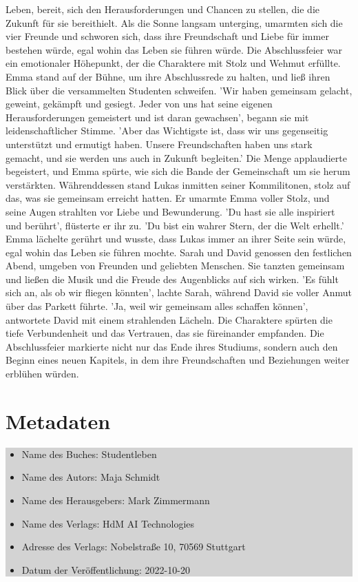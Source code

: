\documentclass[12pt]{article} %
\begin{document}
Leben, bereit, sich den Herausforderungen und Chancen zu stellen, die die Zukunft für sie bereithielt. Als die Sonne langsam unterging, umarmten sich die vier Freunde und schworen sich, dass ihre Freundschaft und Liebe für immer bestehen würde, egal wohin das Leben sie führen würde. Die Abschlussfeier war ein emotionaler Höhepunkt, der die Charaktere mit Stolz und Wehmut erfüllte. Emma stand auf der Bühne, um ihre Abschlussrede zu halten, und ließ ihren Blick über die versammelten Studenten schweifen. 'Wir haben gemeinsam gelacht, geweint, gekämpft und gesiegt. Jeder von uns hat seine eigenen Herausforderungen gemeistert und ist daran gewachsen', begann sie mit leidenschaftlicher Stimme. 'Aber das Wichtigste ist, dass wir uns gegenseitig unterstützt und ermutigt haben. Unsere Freundschaften haben uns stark gemacht, und sie werden uns auch in Zukunft begleiten.' Die Menge applaudierte begeistert, und Emma spürte, wie sich die Bande der Gemeinschaft um sie herum verstärkten. Währenddessen stand Lukas inmitten seiner Kommilitonen, stolz auf das, was sie gemeinsam erreicht hatten. Er umarmte Emma voller Stolz, und seine Augen strahlten vor Liebe und Bewunderung. 'Du hast sie alle inspiriert und berührt', flüsterte er ihr zu. 'Du bist ein wahrer Stern, der die Welt erhellt.' Emma lächelte gerührt und wusste, dass Lukas immer an ihrer Seite sein würde, egal wohin das Leben sie führen mochte. Sarah und David genossen den festlichen Abend, umgeben von Freunden und geliebten Menschen. Sie tanzten gemeinsam und ließen die Musik und die Freude des Augenblicks auf sich wirken. 'Es fühlt sich an, als ob wir fliegen könnten', lachte Sarah, während David sie voller Anmut über das Parkett führte. 'Ja, weil wir gemeinsam alles schaffen können', antwortete David mit einem strahlenden Lächeln. Die Charaktere spürten die tiefe Verbundenheit und das Vertrauen, das sie füreinander empfanden. Die Abschlussfeier markierte nicht nur das Ende ihres Studiums, sondern auch den Beginn eines neuen Kapitels, in dem ihre Freundschaften und Beziehungen weiter erblühen würden.

\clearpage

\section*{Metadaten}
\colorbox{lightgray}{
    \begin{minipage}{\dimexpr\textwidth-2\fboxsep}
        \vspace{1cm}
        \begin{itemize}
            \item Name des Buches: Studentleben
            \item Name des Autors: Maja Schmidt
            \item Name des Herausgebers: Mark Zimmermann
            \item Name des Verlags: HdM AI Technologies
            \item Adresse des Verlags: Nobelstraße 10, 70569 Stuttgart
            \item Datum der Veröffentlichung: 2022-10-20
        \end{itemize}
        \vspace{1cm}
    \end{minipage}
}
\end{document}
